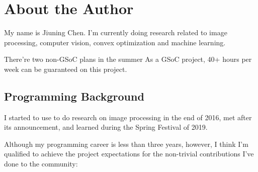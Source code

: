 
\section{About the Author}\label{sec:about_author}

My name is \textsf{Jiuning Chen}. I'm currently doing research related to image processing, computer vision, convex optimization and machine learning.\par

There're two non-GSoC plans in the summer
As a GSoC project, 40+ hours per week can be guaranteed on this project.

\subsection*{Programming Background}

I started to use \langmatlab to do research on image processing in the end of 2016, met  \langjulia after its  announcement, and learned \langpython during the Spring Festival of 2019. \par

Although my programming career is less than three years, however, I think I'm qualified to achieve the project expectations for the non-trivial contributions I've done to the \langjulia{} community:

